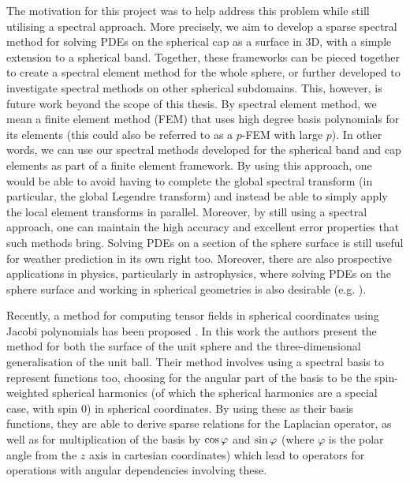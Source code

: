 The motivation for this project was to help address this problem while still utilising a spectral approach. More precisely, we aim to develop a sparse spectral method for solving PDEs on the spherical cap as a surface in 3D, with a simple extension to a spherical band. Together, these frameworks can be pieced together to create a spectral element method for the whole sphere, or further developed to investigate spectral methods on other spherical subdomains. This, however, is future work beyond the scope of this thesis. By spectral element method, we mean a finite element method (FEM) that uses high degree basis polynomials for its elements (this could also be referred to as a $p$-FEM with large $p$). In other words, we can use our spectral methods developed for the spherical band and cap elements as part of a finite element framework. By using this approach, one would be able to avoid having to complete the global spectral transform (in particular, the global Legendre transform) and instead be able to simply apply the local element transforms in parallel. Moreover, by still using a spectral approach, one can maintain the high accuracy and excellent error properties that such methods bring. Solving PDEs on a section of the sphere surface is still useful for weather prediction in its own right too. Moreover, there are also prospective applications in physics, particularly in astrophysics, where solving PDEs on the sphere surface and working in spherical geometries is also desirable (e.g. \cite{vasil2019tensor, reinecke2013libsharp, beyer2014numerical, varshalovich1988quantum, slevinsky2018spectral, rubinstein2015scalar}).

Recently, a method for computing tensor fields in spherical coordinates using Jacobi polynomials has been proposed \cite{vasil2019tensor}. In this work the authors present the method for both the surface of the unit sphere and the three-dimensional generalisation of the unit ball. Their method involves using a spectral basis to represent functions too, choosing for the angular part of the basis to be the spin-weighted spherical harmonics (of which the spherical harmonics are a special case, with spin $0$) in spherical coordinates. By using these as their basis functions, they are able to derive sparse relations for the Laplacian operator, as well as for multiplication of the basis by $\cos\varphi$ and $\sin\varphi$ (where $\varphi$ is the polar angle from the $z$ axis in cartesian coordinates) which lead to operators for operations with angular dependencies involving these. 

